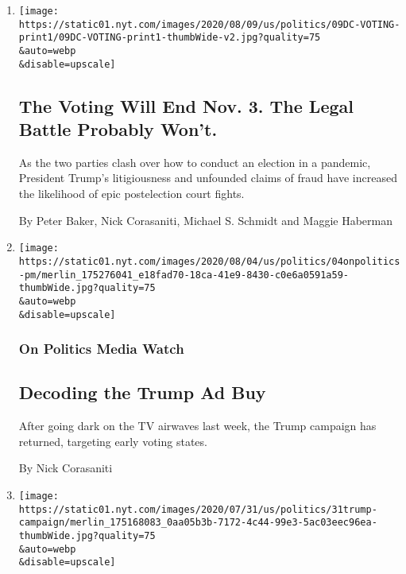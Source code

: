\begin{enumerate}
\def\labelenumi{\arabic{enumi}.}
\item
  \href{/2020/08/08/us/politics/voting-nov-3-election.html}{}

  \texttt{[image: https://static01.nyt.com/images/2020/08/09/us/politics/09DC-VOTING-print1/09DC-VOTING-print1-thumbWide-v2.jpg?quality=75\\\&auto=webp\\\&disable=upscale]}

  \hypertarget{the-voting-will-end-nov-3-the-legal-battle-probably-wont}{%
  \subsection{The Voting Will End Nov. 3. The Legal Battle Probably
  Won't.}\label{the-voting-will-end-nov-3-the-legal-battle-probably-wont}}

  As the two parties clash over how to conduct an election in a
  pandemic, President Trump's litigiousness and unfounded claims of
  fraud have increased the likelihood of epic postelection court fights.

  By Peter Baker, Nick Corasaniti, Michael S. Schmidt and Maggie
  Haberman
\item
  \href{/2020/08/04/us/politics/decoding-the-trump-ad-buy.html}{}

  \texttt{[image: https://static01.nyt.com/images/2020/08/04/us/politics/04onpolitics-pm/merlin\_175276041\_e18fad70-18ca-41e9-8430-c0e6a0591a59-thumbWide.jpg?quality=75\\\&auto=webp\\\&disable=upscale]}

  \hypertarget{on-politics-media-watch}{%
  \subsubsection{On Politics Media
  Watch}\label{on-politics-media-watch}}

  \hypertarget{decoding-the-trump-ad-buy}{%
  \subsection{Decoding the Trump Ad
  Buy}\label{decoding-the-trump-ad-buy}}

  After going dark on the TV airwaves last week, the Trump campaign has
  returned, targeting early voting states.

  By Nick Corasaniti
\item
  \href{/2020/07/31/us/politics/trump-campaign-tv-advertising.html}{}

  \texttt{[image: https://static01.nyt.com/images/2020/07/31/us/politics/31trump-campaign/merlin\_175168083\_0aa05b3b-7172-4c44-99e3-5ac03eec96ea-thumbWide.jpg?quality=75\\\&auto=webp\\\&disable=upscale]}


\end{enumerate}
